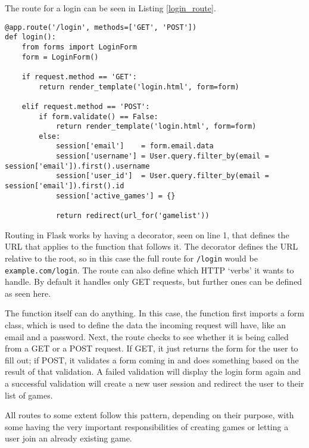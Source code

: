 The route for a login can be seen in Listing \ref{login_route}.

\noindent
\begin{minipage}{\linewidth}
\begin{lstlisting}[style=py, caption={Route for handling logins on the server-side.}, label=login_route]
@app.route('/login', methods=['GET', 'POST'])
def login():
    from forms import LoginForm
    form = LoginForm()

    if request.method == 'GET':
        return render_template('login.html', form=form)

    elif request.method == 'POST':
        if form.validate() == False:
            return render_template('login.html', form=form)
        else:
            session['email']    = form.email.data
            session['username'] = User.query.filter_by(email = session['email']).first().username
            session['user_id']  = User.query.filter_by(email = session['email']).first().id
            session['active_games'] = {}

            return redirect(url_for('gamelist'))
\end{lstlisting}
\end{minipage}

Routing in Flask works by having a decorator, seen on line 1, that defines the URL that applies to the function that follows it. The decorator defines the URL relative to the root, so in this case the full route for \texttt{/login} would be \texttt{example.com/login}. The route can also define which HTTP `verbs' it wants to handle. By default it handles only GET requests, but further ones can be defined as seen here.

The function itself can do anything. In this case, the function first imports a form class, which is used to define the data the incoming request will have, like an email and a password. Next, the route checks to see whether it is being called from a GET or a POST request. If GET, it just returns the form for the user to fill out; if POST, it validates a form coming in and does something based on the result of that validation. A failed validation will display the login form again and a successful validation will create a new user session and redirect the user to their list of games.

All routes to some extent follow this pattern, depending on their purpose, with some having the very important responsibilities of creating games or letting a user join an already existing game.


